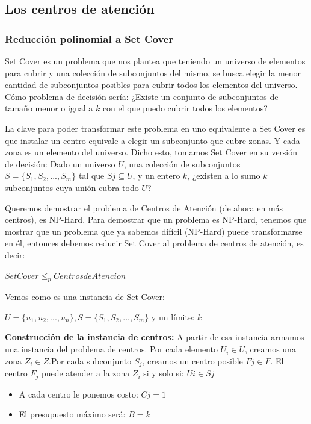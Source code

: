 \documentclass[12pt]{article}
\begin{document}
    \subsection{Los centros de atención}

        \subsubsection{Reducción polinomial a Set Cover}

        Set Cover es un problema que nos plantea que teniendo un universo de elementos para cubrir y una colección de subconjuntos del mismo, se busca elegir la menor cantidad de subconjuntos posibles para cubrir todos los elementos del universo. Cómo problema de decisión sería: ¿Existe un conjunto de subconjuntos de tamaño menor o igual a $k$ con el que puedo cubrir todos los elementos?
        
        La clave para poder transformar este problema en uno equivalente a Set Cover es que instalar un centro equivale a elegir un subconjunto que cubre zonas. Y cada zona es un elemento del universo. Dicho esto, tomamos Set Cover en su versión de decisión: Dado un universo $U$, una colección de subconjuntos $S=\{S_1 ,S_2,...,S_{m}\}$ tal que $Sj \subseteq U$, y un entero $k$, ¿existen a lo sumo $k$ subconjuntos cuya unión cubra todo $U$?

        Queremos demostrar el problema de Centros de Atención (de ahora en más centros), es NP-Hard. Para demostrar que un problema es NP-Hard, tenemos que mostrar que un problema que ya sabemos difícil (NP-Hard) puede transformarse en él, entonces debemos reducir Set Cover al problema de centros de atención, es decir: 
        \begin{center}
            $SetCover \le _p Centros de Atencion$
        \end{center}

        Vemos como es una instancia de Set Cover: 
        \begin{center}
            $U=\{u_1,u_2,...,u_{n}\}, S=\{S_1,S_2,...,S_{m}\} $ y un límite: $k$
        \end{center}
        

        \textbf{Construcción de la instancia de centros: } A partir de esa instancia armamos una instancia del problema de centros. Por cada elemento $U_i \in U$, creamos una zona $Z_i \in Z$.Por cada subconjunto $S_j$, creamos un centro posible $Fj \in F$. El centro $F_j$ puede atender a la zona $Z_i$ si y solo si: $Ui \in Sj$
        \begin{itemize}
            \item A cada centro le ponemos costo: $Cj = 1$
            \item El presupuesto máximo será: $B = k$
        \end{itemize}
        
\end{document}
